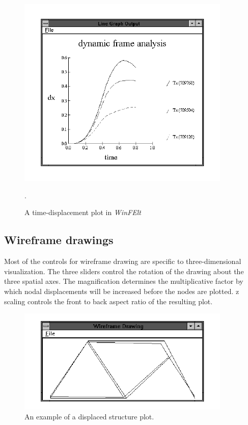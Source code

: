 \begin{figure}
\begin{center}
 \includegraphics[width=4in]{figures/winfelt_graph}
\end{center}
\caption{A time-displacement plot in {\em WinFElt}}.
\label{winfelt.graph}
\end{figure}

\subsection{Wireframe drawings}

Most of the controls for wireframe drawing 
are specific to three-dimensional visualization.  The three sliders
control the rotation of the drawing about the three spatial axes.  The 
magnification determines the multiplicative factor by which nodal 
displacements will be increased before the nodes are plotted.  z scaling 
controls the front to back aspect ratio of the resulting plot.  

\begin{figure}
\begin{center}
 \includegraphics[width=4in]{figures/winfelt_wireframe}
\end{center}
\caption{An example of a displaced structure plot.}
\label{winfelt.wireframe}
\end{figure}


